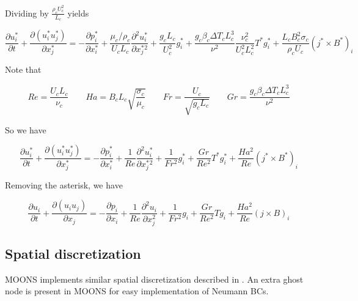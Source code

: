 \documentclass[11pt]{article}
\begin{document}
Dividing by $\frac{\rho_c U_c^2}{L_c}$ yields

\begin{equation}
	\frac{\partial u_i^*}{\partial t} + 
	\frac{\partial (u_i^* u_j^*)}{\partial x_j^*}
	= 
	- \frac{\partial p_i^*}{\partial x_i^*}
	+ \frac{\mu_c/\rho_c}{U_c L_c} 
	\frac{\partial^2 u_i^*}{\partial x_j^*^2}
	+ \frac{g_c L_c}{U_c^2}
	g_i^*
	+ \frac{g_c \beta_c \Delta T_c L_c^3}{\nu^2} \frac{\nu_c^2}{U_c^2 L_c^2} T^*g_i^*
	+ \frac{L_c B_c^2 \sigma_c}{\rho_c U_c}
	(j^* \times B^*)_i
\end{equation}

Note that

\begin{equation}
	Re = \frac{U_c L_c}{\nu_c} \qquad
	Ha = B_c L_c \sqrt{\frac{\sigma_c}{\mu_c}} \qquad
	Fr = \frac{U_c}{\sqrt{g_c L_c}} \qquad
	Gr = \frac{g_c \beta_c \Delta T_c L_c^3}{\nu^2}
\end{equation}

So we have

\begin{equation}
	\frac{\partial u_i^*}{\partial t} + 
	\frac{\partial (u_i^* u_j^*)}{\partial x_j^*}
	= 
	- \frac{\partial p_i^*}{\partial x_i^*}
	+ \frac{1}{Re}
	\frac{\partial^2 u_i^*}{\partial x_j^*^2}
	+ \frac{1}{Fr^2}
	g_i^*
	+ \frac{Gr}{Re^2}
	T^*g_i^*
	+ \frac{Ha^2}{Re}
	(j^* \times B^*)_i
\end{equation}

Removing the asterisk, we have

\begin{equation}
	\boxed{
	\frac{\partial u_i}{\partial t} + 
	\frac{\partial (u_i u_j)}{\partial x_j}
	= 
	- \frac{\partial p_i}{\partial x_i}
	+ \frac{1}{Re}
	\frac{\partial^2 u_i}{\partial x_j^2}
	+ \frac{1}{Fr^2}
	g_i
	+ \frac{Gr}{Re^2}
	T g_i
	+ \frac{Ha^2}{Re}
	(j \times B)_i
	}
\end{equation}


\subsection{Spatial discretization}
MOONS implements similar spatial discretization described in \cite{griebel1997numerical}. An extra ghost node is present in MOONS for easy implementation of Neumann BCs.
\end{document}
